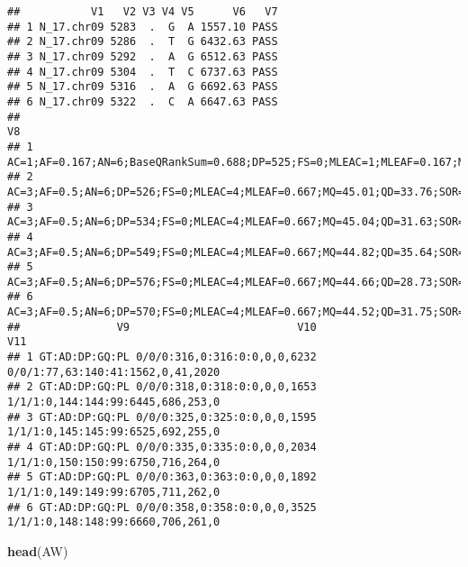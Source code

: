 \documentclass[
]{article}
\newenvironment{Shaded}{\begin{snugshade}}{\end{snugshade}}
\newcommand{\FunctionTok}[1]{\textcolor[rgb]{0.13,0.29,0.53}{\textbf{#1}}}
\newcommand{\NormalTok}[1]{#1}
\begin{document}
\begin{verbatim}
##           V1   V2 V3 V4 V5      V6   V7
## 1 N_17.chr09 5283  .  G  A 1557.10 PASS
## 2 N_17.chr09 5286  .  T  G 6432.63 PASS
## 3 N_17.chr09 5292  .  A  G 6512.63 PASS
## 4 N_17.chr09 5304  .  T  C 6737.63 PASS
## 5 N_17.chr09 5316  .  A  G 6692.63 PASS
## 6 N_17.chr09 5322  .  C  A 6647.63 PASS
##                                                                                                                                        V8
## 1 AC=1;AF=0.167;AN=6;BaseQRankSum=0.688;DP=525;FS=0;MLEAC=1;MLEAF=0.167;MQ=45.09;MQRankSum=-1.578;QD=11.12;ReadPosRankSum=-0.65;SOR=0.703
## 2                                                            AC=3;AF=0.5;AN=6;DP=526;FS=0;MLEAC=4;MLEAF=0.667;MQ=45.01;QD=33.76;SOR=1.006
## 3                                                            AC=3;AF=0.5;AN=6;DP=534;FS=0;MLEAC=4;MLEAF=0.667;MQ=45.04;QD=31.63;SOR=0.987
## 4                                                            AC=3;AF=0.5;AN=6;DP=549;FS=0;MLEAC=4;MLEAF=0.667;MQ=44.82;QD=35.64;SOR=0.927
## 5                                                            AC=3;AF=0.5;AN=6;DP=576;FS=0;MLEAC=4;MLEAF=0.667;MQ=44.66;QD=28.73;SOR=0.881
## 6                                                            AC=3;AF=0.5;AN=6;DP=570;FS=0;MLEAC=4;MLEAF=0.667;MQ=44.52;QD=31.75;SOR=0.806
##               V9                          V10                               V11
## 1 GT:AD:DP:GQ:PL 0/0/0:316,0:316:0:0,0,0,6232 0/0/1:77,63:140:41:1562,0,41,2020
## 2 GT:AD:DP:GQ:PL 0/0/0:318,0:318:0:0,0,0,1653 1/1/1:0,144:144:99:6445,686,253,0
## 3 GT:AD:DP:GQ:PL 0/0/0:325,0:325:0:0,0,0,1595 1/1/1:0,145:145:99:6525,692,255,0
## 4 GT:AD:DP:GQ:PL 0/0/0:335,0:335:0:0,0,0,2034 1/1/1:0,150:150:99:6750,716,264,0
## 5 GT:AD:DP:GQ:PL 0/0/0:363,0:363:0:0,0,0,1892 1/1/1:0,149:149:99:6705,711,262,0
## 6 GT:AD:DP:GQ:PL 0/0/0:358,0:358:0:0,0,0,3525 1/1/1:0,148:148:99:6660,706,261,0
\end{verbatim}

\begin{Shaded}
\begin{Highlighting}[]
\FunctionTok{head}\NormalTok{(AW)}
\end{Highlighting}
\end{Shaded}
\end{document}
